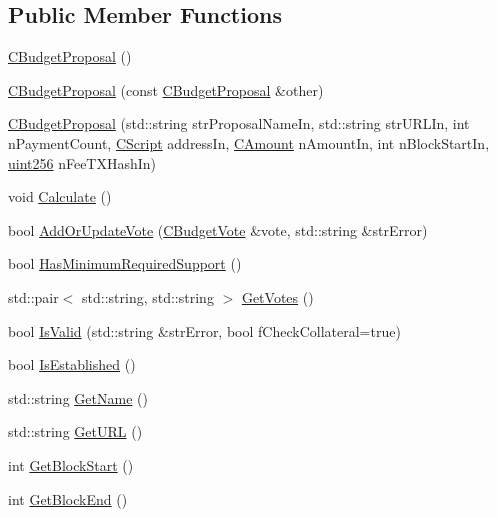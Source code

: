\subsection*{Public Member Functions}
\begin{DoxyCompactItemize}
\item 
\hyperlink{class_c_budget_proposal_a30d26a2189f74f7c1f55db353569c366}{C\+Budget\+Proposal} ()
\item 
\hyperlink{class_c_budget_proposal_a82ffaf35b2494a9e499aa59df44be56d}{C\+Budget\+Proposal} (const \hyperlink{class_c_budget_proposal}{C\+Budget\+Proposal} \&other)
\item 
\hyperlink{class_c_budget_proposal_a8d1de8e78ea83c897e89e0046fa3172e}{C\+Budget\+Proposal} (std\+::string str\+Proposal\+Name\+In, std\+::string str\+U\+R\+L\+In, int n\+Payment\+Count, \hyperlink{class_c_script}{C\+Script} address\+In, \hyperlink{amount_8h_a4eaf3a5239714d8c45b851527f7cb564}{C\+Amount} n\+Amount\+In, int n\+Block\+Start\+In, \hyperlink{classuint256}{uint256} n\+Fee\+T\+X\+Hash\+In)
\item 
void \hyperlink{class_c_budget_proposal_a62e5e004af90cfce33eddef90dcdb7e2}{Calculate} ()
\item 
bool \hyperlink{class_c_budget_proposal_ad153df04aa541d0c06eb068d79d0cf96}{Add\+Or\+Update\+Vote} (\hyperlink{class_c_budget_vote}{C\+Budget\+Vote} \&vote, std\+::string \&str\+Error)
\item 
bool \hyperlink{class_c_budget_proposal_a839252a583d69a6d4301aa613fceab14}{Has\+Minimum\+Required\+Support} ()
\item 
std\+::pair$<$ std\+::string, std\+::string $>$ \hyperlink{class_c_budget_proposal_a60b112e2960d824dfcc8bc78414c09cc}{Get\+Votes} ()
\item 
bool \hyperlink{class_c_budget_proposal_afaa5e910085e8f0aea26aad6fa99ed2b}{Is\+Valid} (std\+::string \&str\+Error, bool f\+Check\+Collateral=true)
\item 
bool \hyperlink{class_c_budget_proposal_a0f4231aa216c99a6a3ad2b6bf31d8bfe}{Is\+Established} ()
\item 
std\+::string \hyperlink{class_c_budget_proposal_a7f3bf6d86e4f4af03a45aa1c6d177af1}{Get\+Name} ()
\item 
std\+::string \hyperlink{class_c_budget_proposal_a4bddce62840e993e7351e68bfafca05d}{Get\+U\+R\+L} ()
\item 
int \hyperlink{class_c_budget_proposal_a711280cfc20e1d1a76a2b8c59dfe26ad}{Get\+Block\+Start} ()
\item 
int \hyperlink{class_c_budget_proposal_ad3e5e60c9fe53d7aef3314634eae54d7}{Get\+Block\+End} ()

\end{DoxyCompactItemize}
